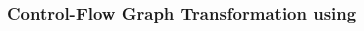 \begin{frame}[t]
	\frametitle{Control-Flow Graph Transformation using \qvasr}
	\begin{columns}[c]
		\begin{column}{0.4\textwidth}
			\vspace*{0.5cm}
			
		\end{column}
		\begin{column}{0.4\textwidth}
			\resizebox{\textwidth}{!}{}
		\end{column}
	\end{columns}
\end{frame}